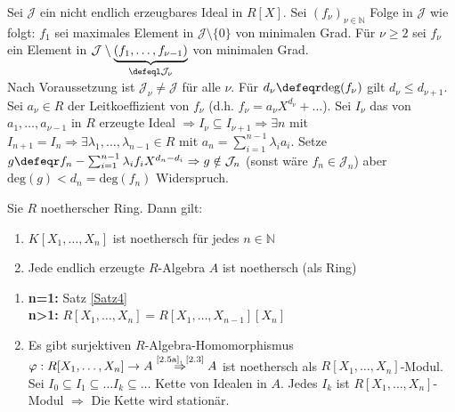 \begin{Bew} 
  Sei $\mathcal{J}$ ein nicht endlich erzeugbares Ideal in $R[X]$.
  Sei $(f_{\nu})_{\nu \in \mathbb{N}}$ Folge in $\mathcal{J}$ wie folgt:
  $f_1$ sei maximales Element in $\mathcal{J} \setminus \{0\}$ von minimalen
  Grad. Für $\nu \ge 2$ sei $f_{\nu}$ ein Element in $\mathcal{J} \setminus
  \underset{\defeql \mathcal{J}_{\nu}}{\underbrace{(f_1, \dots , f_{\nu - 1})}}$
  von minimalen Grad.\\
  Nach Voraussetzung ist $\mathcal{J}_{\nu} \not= \mathcal{J}$ für alle $\nu$.
  Für $d_{\nu} \defeqr \mbox{deg}(f_{\nu})$ gilt $d_{\nu} \le d_{\nu + 1}$.
  Sei $a_{\nu} \in R$ der Leitkoeffizient von $f_{\nu}$ (d.h. $f_{\nu} =
  a_{\nu} X^{d_{\nu}} + \dots$). Sei $I_{\nu}$ das von $a_1, \dots , a_{\nu -1}$
  in $R$ erzeugte Ideal $\Rightarrow I_{\nu} \subseteq I_{\nu + 1} \Rightarrow
  \exists n$ mit $I_{n+1} = I_n \Rightarrow \exists \lambda_1, \dots ,
  \lambda_{n-1} \in R$ mit $a_n = \sum_{i=1}^{n-1} \lambda_i a_i$.
  Setze $g \defeqr f_n - \sum_{i=1}^{n-1} \lambda_i f_i X^{d_n - d_i}
  \Rightarrow g \notin \mathcal{J}_n$ (sonst wäre $f_n \in \mathcal{J}_n$) aber
  $\mbox{deg}(g) < d_n = \mbox{deg}(f_n)$ Widerspruch.
\end{Bew}

\begin{Folg} 
  Sie $R$ noetherscher Ring. Dann gilt:
  \begin{enumerate}
    \item \label{2.5a} $K[X_1, \dots , X_n]$ ist noethersch für jedes $n \in
    \mathbb{N}$
    \item Jede endlich erzeugte $R$-Algebra $A$ ist noethersch (als Ring)
  \end{enumerate}
\end{Folg}

\begin{Bew} 
  \begin{enumerate} 
    \item \textbf{n=1:} Satz \ref{Satz4}\\
          \textbf{n>1:} $R[X_1, \dots , X_n] = R[X_1, \dots , X_{n-1}][X_n]$
    \item Es gibt surjektiven $R$-Algebra-Homomorphismus $\varphi: R[X_1, \dots
          , X_n] \to A \overset{\mbox{\scriptsize \ref{2.5a},
          \ref{2.3}}}{\Rightarrow} A$ ist noethersch als $R[X_1, \dots ,
          X_n]$-Modul. Sei $I_0 \subseteq I_1 \subseteq \dots I_k \subseteq
          \dots$ Kette von Idealen in $A$. Jedes $I_k$ ist $R[X_1, \dots ,
          X_n]$-Modul $\Rightarrow$ Die Kette wird stationär.
\end{enumerate}
\end{Bew}
